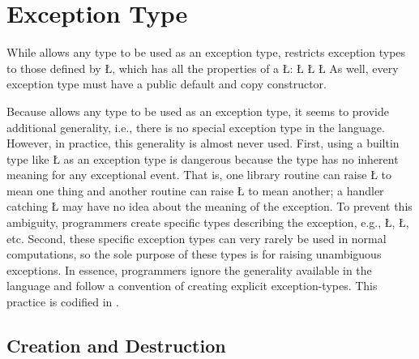 \documentclass[openright,twoside]{report}
\begin{document}
\section{Exception Type}
\label{s:ExceptionType}

While \CC allows any type to be used as an exception type, \uC restricts exception types to those defined by \LGinlinetrue\LGbegin\lgrinde\L{}\endlgrinde\LGend{}, which has all the properties of a \LGinlinetrue\LGbegin\lgrinde\L{}\endlgrinde\LGend{}:
\LGinlinefalse\LGbegin\lgrinde
\L{}
\L{\LB{}}
\L{\LB{\};}}
\endlgrinde\LGend
As well, every exception type must have a public default and copy constructor.

\begin{annotation}
Because \CC allows any type to be used as an exception type, it seems to provide additional generality, i.e., there is no special exception type in the language.
However, in practice, this generality is almost never used.
First, using a builtin type like \LGinlinetrue\LGbegin\lgrinde\L{}\endlgrinde\LGend{} as an exception type is dangerous because the type has no inherent meaning for any exceptional event.
That is, one library routine can raise \LGinlinetrue\LGbegin\lgrinde\L{}\endlgrinde\LGend{} to mean one thing and another routine can raise \LGinlinetrue\LGbegin\lgrinde\L{}\endlgrinde\LGend{} to mean another;
a handler catching \LGinlinetrue\LGbegin\lgrinde\L{}\endlgrinde\LGend{} may have no idea about the meaning of the exception.
To prevent this ambiguity, programmers create specific types describing the exception, e.g., \LGinlinetrue\LGbegin\lgrinde\L{}\endlgrinde\LGend{}, \LGinlinetrue\LGbegin\lgrinde\L{}\endlgrinde\LGend{}, etc.
Second, these specific exception types can very rarely be used in normal computations, so the sole purpose of these types is for raising unambiguous exceptions.
In essence, \CC programmers ignore the generality available in the language and follow a convention of creating explicit exception-types.
This practice is codified in \uC.
\end{annotation}


\subsection{Creation and Destruction}
\end{document}
